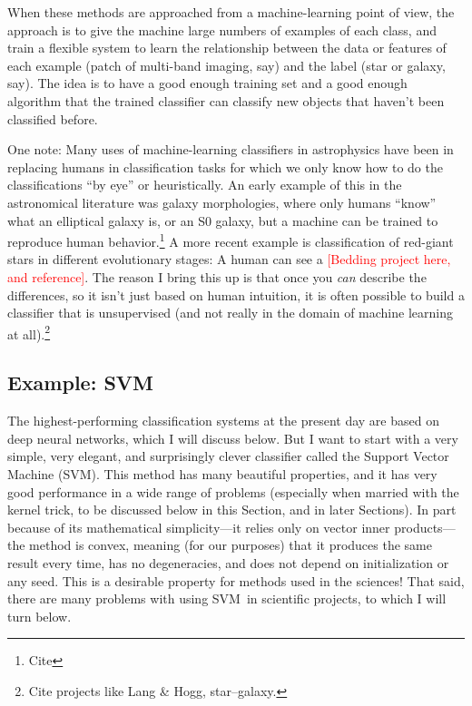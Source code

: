 \documentclass[12pt, twoside, letterpaper]{article}
\newcommand{\sectionname}{Section}
\newcommand{\sectionnames}{Sections}
\newcommand{\acronym}[1]{{\small{#1}}}
\newcommand{\SVM}{\acronym{SVM}}
\newcommand{\todo}[1]{\textcolor{red}{#1}}  %
\begin{document}
When these methods are approached from a machine-learning point of view,
the approach is to give the machine large numbers of examples of each
class, and train a flexible system to learn the relationship between the
data or features of each example (patch of multi-band imaging, say) and
the label (star or galaxy, say). The idea is to have a good enough training
set and a good enough algorithm that the trained classifier can classify
new objects that haven't been classified before.

One note: Many uses of machine-learning classifiers in astrophysics have
been in replacing humans in classification tasks for which
we only know how to do the classifications
``by eye'' or heuristically. An early example of this in the
astronomical literature was galaxy morphologies, where only
humans ``know'' what an elliptical galaxy is, or an S0 galaxy, but a machine
can be trained to reproduce human behavior.\footnote{Cite} A more recent
example is classification of red-giant stars in different evolutionary stages:
A human can see a \todo{[Bedding project here, and reference]}. The reason
I bring this up is that once you \emph{can} describe the differences, so it
isn't just based on human intuition, it is often possible to build a
classifier that is unsupervised (and not really in the domain of machine
learning at all).\footnote{Cite projects like Lang \& Hogg, star--galaxy.}

\subsection{Example: SVM}

The highest-performing classification systems at the present day are based
on deep neural networks, which I will discuss below.
But I want to start with a very simple, very elegant, and surprisingly clever
classifier called the Support Vector Machine (\SVM).
This method has many beautiful properties, and it has very good performance
in a wide range of problems (especially when married with the kernel trick,
to be discussed below in this \sectionname, and in later \sectionnames).
In part because of its mathematical simplicity---it relies only on vector
inner products---the method is convex, meaning (for our purposes) that it
produces the same result every time, has no degeneracies, and does not depend
on initialization or any seed.
This is a desirable property for methods used in the sciences!
That said, there are many problems with using \SVM\ in scientific projects,
to which I will turn below.
\end{document}
